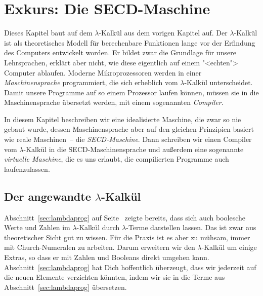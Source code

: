 
\chapter{Exkurs: Die SECD-Maschine}\label{cha:secd}

Dieses Kapitel baut auf dem $\lambda$-Kalkül aus dem vorigen Kapitel auf.
Der $\lambda$-Kalkül ist als theoretisches Modell für berechenbare
Funktionen lange vor der Erfindung des Computers entwickelt worden.
Er bildet zwar die Grundlage für unsere Lehrsprachen, erklärt aber
nicht, wie diese eigentlich auf einem "<echten"> Computer ablaufen.
Moderne Mikroprozessoren werden in einer \textit{Maschinensprache}
programmiert, die sich erheblich vom $\lambda$-Kalkül unterscheidet.
Damit unsere Programme auf so einem Prozessor laufen können, müssen
sie in die Maschinensprache übersetzt werden,
mit einem sogenannten \textit{Compiler}.

In diesem Kapitel beschreiben wir eine idealisierte Maschine, die zwar
so nie gebaut wurde, dessen Maschinensprache aber auf den gleichen
Prinzipien basiert wie reale Maschinen~-- die \textit{SECD-Maschine}.
Dann schreiben wir
einen Compiler vom $\lambda$-Kalkül in die SECD-Maschinensprache
und außerdem eine sogenannte
\textit{virtuelle Maschine}, die es uns erlaubt, die compilierten
Programme auch laufenzulassen.

\section{Der angewandte $\lambda$-Kalkül}

Abschnitt~\ref{sec:lambdaprog} auf Seite~\pageref{sec:lambdaprog}
zeigte bereits, dass sich auch boolesche Werte und Zahlen im
$\lambda$-Kalkül durch $\lambda$-Terme darstellen lassen.  Das ist
zwar aus theoretischer Sicht gut zu wissen.  Für die Praxis ist es
aber zu mühsam, immer mit Church-Numeralen zu arbeiten. Darum
erweitern wir den $\lambda$-Kalkül um einige Extras, so dass er mit
Zahlen und Booleans direkt umgehen kann.
Abschnitt~\ref{sec:lambdaprog} hat Dich hoffentlich überzeugt, dass
wir jederzeit auf die neuen Elemente verzichten könnten, indem wir sie
in die Terme aus Abschnitt~\ref{sec:lambdaprog} übersetzen.

